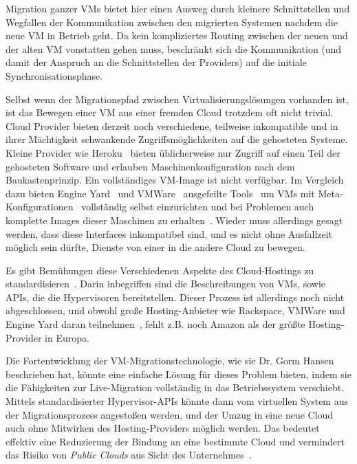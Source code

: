 Migration ganzer VMs bietet hier einen Ausweg durch kleinere
Schnittstellen und Wegfallen der Kommunikation zwischen den migrierten
Systemen nachdem die neue VM in Betrieb geht. Da kein kompliziertes
Routing zwischen der neuen und der alten VM vonstatten gehen muss,
beschränkt sich die Kommunikation (und damit der Anspruch an die
Schnittstellen der Providers) auf die initiale Synchronisationsphase.

Selbst wenn der Migrationspfad zwischen Virtualisierungslösungen
vorhanden ist, ist das Bewegen einer VM aus einer fremden Cloud
trotzdem oft nicht trivial. Cloud Provider bieten derzeit noch
verschiedene, teilweise inkompatible und in ihrer Mächtigkeit
schwankende Zugriffsmöglichkeiten auf die gehosteten Systeme. Kleine
Provider wie Heroku~\cite{none} bieten üblicherweise nur Zugriff auf
einen Teil der gehosteten Software und erlauben Maschinenkonfiguration
nach dem Baukastenprinzip. Ein vollständiges VM-Image ist nicht
verfügbar. Im Vergleich dazu bieten Engine Yard~\cite{none} und
VMWare~\cite{none} ausgefeilte Tools~\cite{none} um VMs mit
Meta-Konfigurationen~\cite{chef} vollständig selbst einzurichten und
bei Problemen auch komplette Images dieser Maschinen zu
erhalten~\cite{none}. Wieder muss allerdings gesagt werden, dass diese
Interfaces inkompatibel sind, und es nicht ohne Ausfallzeit möglich
sein dürfte, Dienste von einer in die andere Cloud zu bewegen.

Es gibt Bemühungen diese Verschiedenen Aspekte des Cloud-Hostings zu
standardisieren~\cite{cloudstandard}. Darin inbegriffen sind die
Beschreibungen von VMs, sowie APIs, die die Hypervisoren
bereitstellen. Dieser Prozess ist allerdings noch nicht abgeschlossen,
und obwohl große Hosting-Anbieter wie Rackspace, VMWare und Engine
Yard daran teilnehmen~\cite{none}, fehlt z.B. noch Amazon als der
größte Hosting-Provider in Europa.

Die Fortentwicklung der VM-Migrationstechnologie, wie sie
Dr. Gorm Hansen beschrieben hat, könnte eine einfache Lösung für
dieses Problem bieten, indem sie die Fähigkeiten zur Live-Migration
vollständig in das Betriebssystem verschiebt. Mittels
standardisierter Hypervisor-APIs könnte dann vom virtuellen System
aus der Migrationsprozess angestoßen werden, und der Umzug in eine
neue Cloud auch ohne Mitwirken des Hosting-Providers möglich
werden. Das bedeutet effektiv eine Reduzierung der Bindung an eine
bestimmte Cloud und vermindert das Risiko von \emph{Public Clouds} aus
Sicht des Unternehmes~\cite{none}.

